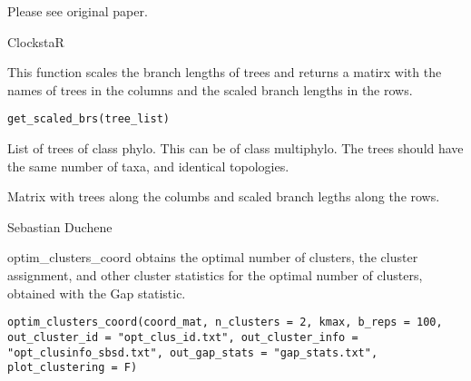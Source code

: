 \documentclass[a4paper]{book}
\begin{document}
%
\begin{References}\relax
Please see original paper. 
\end{References}
%
\begin{SeeAlso}\relax
ClockstaR
\end{SeeAlso}
%
\begin{Description}\relax
This function scales the branch lengths of trees and returns a matirx with the names of trees in the columns and the scaled branch lengths in the rows.
\end{Description}
%
\begin{Usage}
\begin{verbatim}
get_scaled_brs(tree_list)
\end{verbatim}
\end{Usage}
%
\begin{Arguments}
\begin{ldescription}
\item[\code{tree\_list}] 
List of trees of class phylo. This can be of class multiphylo. The trees should have the same number of taxa, and identical topologies.

\end{ldescription}
\end{Arguments}
%
\begin{Value}
Matrix with trees along the columbs and scaled branch legths along the rows.
\end{Value}
%
\begin{Author}\relax
Sebastian Duchene
\end{Author}
%
\begin{Description}\relax
optim\_clusters\_coord obtains the optimal number of clusters, the cluster assignment, and other cluster statistics for the optimal number of clusters, obtained with the Gap statistic. 
\end{Description}
%
\begin{Usage}
\begin{verbatim}
optim_clusters_coord(coord_mat, n_clusters = 2, kmax, b_reps = 100, out_cluster_id = "opt_clus_id.txt", out_cluster_info = "opt_clusinfo_sbsd.txt", out_gap_stats = "gap_stats.txt", plot_clustering = F)
\end{verbatim}
\end{Usage}
\end{document}
